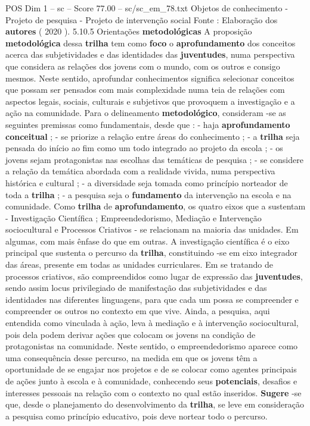 \begin{textsample}{POS Dim 1 – sc – Score 77.00 – sc/sc\_em\_78.txt}
Objetos de conhecimento - Projeto de pesquisa - Projeto de intervenção social Fonte : Elaboração dos \textbf{autores} ( 2020 ). 5.10.5 Orientações \textbf{metodológicas} A proposição \textbf{metodológica} dessa \textbf{trilha} tem como \textbf{foco} o \textbf{aprofundamento} dos conceitos acerca das subjetividades e das identidades das \textbf{juventudes}, numa perspectiva que considera as relações dos jovens com o mundo, com os outros e consigo mesmos.
Neste sentido, aprofundar conhecimentos significa selecionar conceitos que possam ser pensados com mais complexidade numa teia de relações com aspectos legais, sociais, culturais e subjetivos que provoquem a investigação e a ação na comunidade.
Para o delineamento \textbf{metodológico}, consideram -se as seguintes premissas como fundamentais, desde que : - haja \textbf{aprofundamento} \textbf{conceitual} ; - se priorize a relação entre áreas do conhecimento ; - a \textbf{trilha} seja pensada do início ao fim como um todo integrado ao projeto da escola ; - os jovens sejam protagonistas nas escolhas das temáticas de pesquisa ; - se considere a relação da temática abordada com a realidade vivida, numa perspectiva histórica e cultural ; - a diversidade seja tomada como princípio norteador de toda a \textbf{trilha} ; - a pesquisa seja o \textbf{fundamento} da intervenção na escola e na comunidade.
Como \textbf{trilha} de \textbf{aprofundamento}, os quatro eixos que a sustentam - Investigação Científica ; Empreendedorismo, Mediação e Intervenção sociocultural e Processos Criativos - se relacionam na maioria das unidades.
Em algumas, com mais ênfase do que em outras.
A investigação científica é o eixo principal que sustenta o percurso da \textbf{trilha}, constituindo -se em eixo integrador das áreas, presente em todas as unidades curriculares.
Em se tratando de processos criativos, são compreendidos como lugar de expressão das \textbf{juventudes}, sendo assim locus privilegiado de manifestação das subjetividades e das identidades nas diferentes linguagens, para que cada um possa se compreender e compreender os outros no contexto em que vive.
Ainda, a pesquisa, aqui entendida como vinculada à ação, leva à mediação e à intervenção sociocultural, pois dela podem derivar ações que colocam os jovens na condição de protagonistas na comunidade.
Neste sentido, o empreendedorismo aparece como uma consequência desse percurso, na medida em que os jovens têm a oportunidade de se engajar nos projetos e de se colocar como agentes principais de ações junto à escola e à comunidade, conhecendo seus \textbf{potenciais}, desafios e interesses pessoais na relação com o contexto no qual estão inseridos. \textbf{Sugere} -se que, desde o planejamento do desenvolvimento da \textbf{trilha}, se leve em consideração a pesquisa como princípio educativo, pois deve nortear todo o percurso.

\end{textsample}
